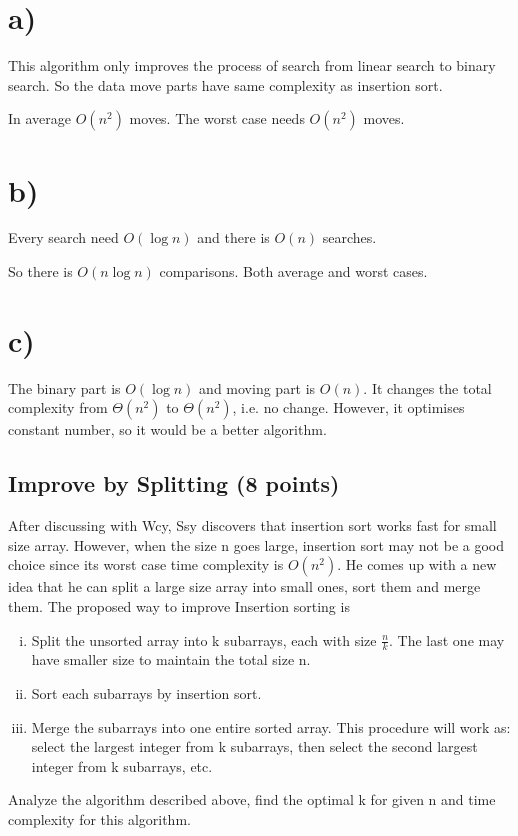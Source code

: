 \documentclass[11pt]{exam}
\begin{document}
\begin{solution}
    \section*{a)}
    This algorithm only improves the process of search from linear search to binary search.
    So the data move parts have same complexity as insertion sort.
    
    In average $O(n^2)$ moves.
    The worst case needs $O(n^2)$ moves.
    
    \section*{b)}
    Every search need $O(\log n)$ and there is $O(n)$ searches.

    So there is $O(n\log n)$ comparisons. Both average and worst cases.

    \section*{c)}
    The binary part is $O(\log n) $ and moving part is $O(n)$. It changes the total complexity from $\Theta(n^2)$ to $\Theta(n^2)$, i.e. no change. However, it optimises constant number, so it would be a better algorithm.

\end{solution}

\subsection{Improve by Splitting (8 points)}
After discussing with Wcy, Ssy discovers that insertion sort works fast for small size array. However, when the size n goes large, insertion sort may not be a good choice since its worst case time complexity is $O(n^2)$. He comes up with a new idea that he can split a large size array into small ones, sort them and merge them. The proposed way to improve Insertion sorting is
\begin{enumerate}[i)]
    \item Split the unsorted array into k subarrays, each with size $\frac{n}{k}$. The last one may have smaller size to maintain the total size n.
    \item Sort each subarrays by insertion sort.
    \item Merge the subarrays into one entire sorted array. This procedure will work as: select the largest integer from k subarrays, then select the second largest integer from k subarrays, etc.
\end{enumerate}
Analyze the algorithm described above, find the optimal k for given n and time complexity for this algorithm.
\end{document}

